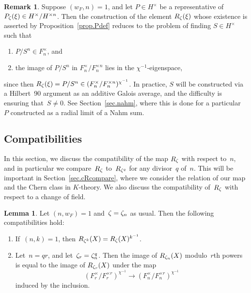 \documentclass[12pt,reqno]{amsart}
\theoremstyle{definition}
\newtheorem{lemma}[theorem]{Lemma}
\newtheorem{remark}[theorem]{Remark}
\newcommand{\changed}[1]{{#1}}
\newcommand{\frankchanged}[1]{{#1}}
\def\be{\begin{equation}}
\def\ee{\end{equation}}
\def\nn{n}
\begin{document}
\begin{remark}
\label{rem.effectiveR}
Suppose $(w_F,\nn)=1$, and let $P \in H^\times$ be a representative
of $P_\z(\xi) \in H^\times/H^{\times \nn}$. Then the construction of the element 
$R_\zeta(\xi)$ whose existence is asserted by Proposition~\ref{prop.Pdef}
reduces to the problem of finding $S \in H^\times$ such that 
\begin{enumerate}[label=(\alph*)]
\item
$P/S^\nn \in F_\nn^\times$, and
\item
the image of $P/S^\nn$ in $F_\nn^\times/F_\nn^{\times \nn}$ lies in the 
$\chi^{-1}$-eigenspace, 
\end{enumerate}
since then $R_\z(\xi) = P/S^\nn \in (F_\nn^\times/F_\nn^{\times \nn})^{\chi^{-1}}$. 
In practice, $S$ will be constructed via a Hilbert~90 argument as an
additive Galois average, and the difficulty is ensuring that~$S \neq 0$.
See Section~\ref{sec.nahm}, where this is done for a particular~$P$
constructed as a radial limit of a Nahm sum. 
\end{remark}

\subsection{\changed{Compatibilities}}
\label{sub.primepowers}

In this section,  we discuss the compatibility of the map $R_\zeta$
with \frankchanged{respect to~$\nn$, and in particular we compare~$R_{\zeta}$
to~$R_{\zeta^q}$ for any divisor~$q$ of~$\nn$.}
This will be important in Section~\ref{sec.cRcompare},
where we consider the relation of our map and the Chern class in $K$-theory.
\changed{We also discuss the compatibility of~$R_{\zeta}$ with respect to a change of field.}

\begin{lemma}
\label{lemma:compatibility} 
Let $(\nn,w_F)=1$ and~$\z=\z_\nn$ as usual. Then
the following compatibilities hold:
\begin{enumerate}
\item  \label{lemma:compatibilitytwo}
If~$(\nn,k) = 1$, then $R_{\zeta^k}(X) = R_\zeta(X)^{k^{-1}}$.
\item 
Let~$\nn = qr$,  and let~$\z_{r} = \z^{q}_\nn$. Then the image of $R_{\z_\nn}(X)$ 
modulo~$r$th powers is equal to the image of $R_{\zeta_{r}}(X)$ under the map
\be 
\label{warning}
\left(F_r^{\times}/F_r^{\times r}\right)^{\chi^{-1}} \rightarrow 
\left(F_\nn^{\times}/F_\nn^{\times r}\right)^{\chi^{-1}}
\ee
induced by the inclusion.
\end{enumerate}
\end{lemma}
\end{document}

